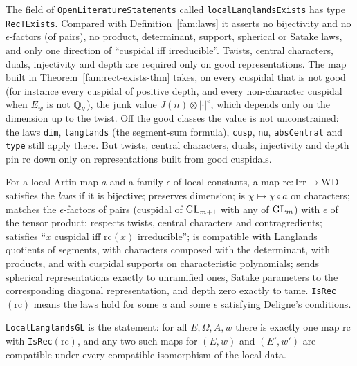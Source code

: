 \begin{remark}\label{fam:rem-not-llc}
The field of \texttt{OpenLiteratureStatements} called \texttt{localLanglandsExists} has type \texttt{RecTExists}. Compared with Definition~\ref{fam:laws} it asserts no bijectivity and no $\epsilon$-factors (of pairs), no product, determinant, support, spherical or Satake laws, and only one direction of ``cuspidal iff irreducible''. Twists, central characters, duals, injectivity and depth are required only on good representations. The map built in Theorem~\ref{fam:rect-exists-thm} takes, on every cuspidal that is not good (for instance every cuspidal of positive depth, and every non-character cuspidal when $E_w$ is not $\mathbb{Q}_g$), the junk value $J(n)\otimes|\cdot|^{e}$, which depends only on the dimension up to the twist. Off the good classes the value is not unconstrained: the laws \texttt{dim}, \texttt{langlands} (the segment-sum formula), \texttt{cusp}, \texttt{nu}, \texttt{absCentral} and \texttt{type} still apply there. But twists, central characters, duals, injectivity and depth pin $\mathrm{rc}$ down only on representations built from good cuspidals.
\end{remark}

\begin{definition}\label{fam:laws}
For a local Artin map $a$ and a family $\epsilon$ of local constants, a map $\mathrm{rc}\colon\mathrm{Irr}\to\mathrm{WD}$ satisfies the \emph{laws} if it is bijective; preserves dimension; is $\chi\mapsto\chi\circ a$ on characters; matches the $\epsilon$-factors of pairs (cuspidal of $\mathrm{GL}_{m+1}$ with any of $\mathrm{GL}_m$) with $\epsilon$ of the tensor product; respects twists, central characters and contragredients; satisfies ``$x$ cuspidal iff $\mathrm{rc}(x)$ irreducible''; is compatible with Langlands quotients of segments, with characters composed with the determinant, with products, and with cuspidal supports on characteristic polynomials; sends spherical representations exactly to unramified ones, Satake parameters to the corresponding diagonal representation, and depth zero exactly to tame. \texttt{IsRec}$(\mathrm{rc})$ means the laws hold for some $a$ and some $\epsilon$ satisfying Deligne's conditions.
\end{definition}

\begin{definition}\label{fam:llc}
\texttt{LocalLanglandsGL} is the statement: for all $E,\Omega,A,w$ there is exactly one map $\mathrm{rc}$ with \texttt{IsRec}$(\mathrm{rc})$, and any two such maps for $(E,w)$ and $(E',w')$ are compatible under every compatible isomorphism of the local data.
\end{definition}


